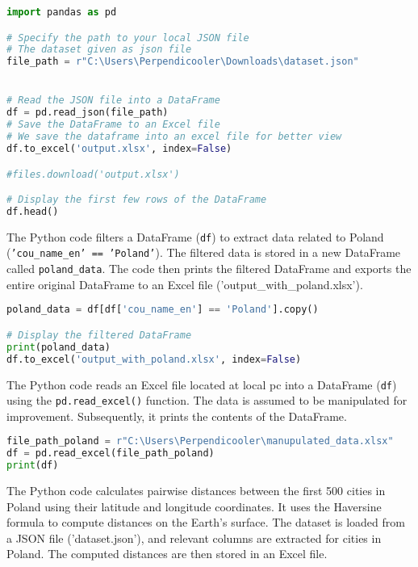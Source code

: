 \begin{center}
    \begin{lstlisting}[language=Python, caption=Loading the Dataset]
    import pandas as pd

# Specify the path to your local JSON file
# The dataset given as json file
file_path = r"C:\Users\Perpendicooler\Downloads\dataset.json"


# Read the JSON file into a DataFrame
df = pd.read_json(file_path)
# Save the DataFrame to an Excel file
# We save the dataframe into an excel file for better view
df.to_excel('output.xlsx', index=False)

#files.download('output.xlsx')

# Display the first few rows of the DataFrame
df.head()

\end{lstlisting}
\end{center}
The Python code filters a DataFrame (\texttt{df}) to extract data related to Poland (\texttt{'cou\_name\_en' == 'Poland'}). The filtered data is stored in a new DataFrame called \texttt{poland\_data}. The code then prints the filtered DataFrame and exports the entire original DataFrame to an Excel file ('output\_with\_poland.xlsx').
\begin{center}
    \begin{lstlisting}[language=Python, caption=Loading the Dataset]
        poland_data = df[df['cou_name_en'] == 'Poland'].copy()

# Display the filtered DataFrame
print(poland_data)
df.to_excel('output_with_poland.xlsx', index=False)

    \end{lstlisting} 
\end{center} 
The Python code reads an Excel file located at local pc into a DataFrame (\texttt{df}) using the \texttt{pd.read\_excel()} function. The data is assumed to be manipulated for improvement. Subsequently, it prints the contents of the DataFrame.
\begin{center}
    \begin{lstlisting}[language=Python, caption=Loading the Dataset]
        file_path_poland = r"C:\Users\Perpendicooler\manupulated_data.xlsx"
df = pd.read_excel(file_path_poland)
print(df)
    \end{lstlisting}
\end{center}
The Python code calculates pairwise distances between the first 500 cities in Poland using their latitude and longitude coordinates. It uses the Haversine formula to compute distances on the Earth's surface. The dataset is loaded from a JSON file ('dataset.json'), and relevant columns are extracted for cities in Poland. The computed distances are then stored in an Excel file.
